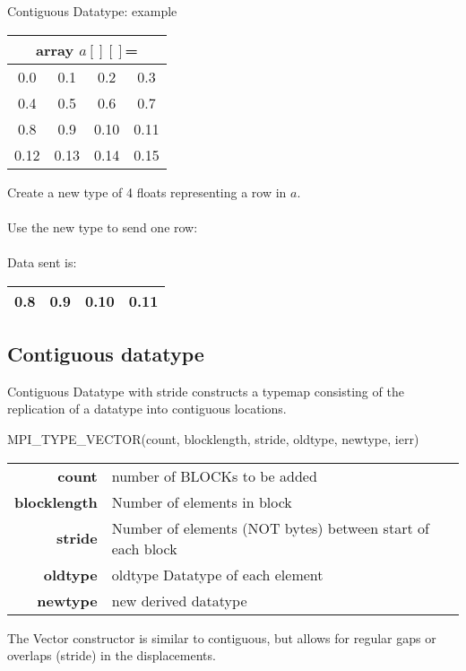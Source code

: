 \documentclass[aspectratio=43]{beamer}
\begin{document}
\begin{frame}[fragile]{Contiguous Datatype: example}
\begin{center}
\begin{tabular}{|c|c|c|c|}
    \multicolumn{4}{c}{array $a[][]$=}\\\hline
0.0  & 0.1  & 0.2  & 0.3\\\hline
0.4  & 0.5  & 0.6  & 0.7\\\hline
0.8  & 0.9  & 0.10 & 0.11\\\hline
0.12 & 0.13 & 0.14 & 0.15\\\hline
\end{tabular}
\end{center}
Create a new type of 4 floats representing a row in $a$.\\
\\[0.5cm]
Use the new type to send one row:\\
\\[0.5cm]
Data sent is:
\begin{tabular}{|c|c|c|c|}
\hline
\color{cscsblue}0.8  & \color{cscsblue}0.9  & \color{cscsblue}0.10 & \color{cscsblue}0.11\\
\hline
\end{tabular}

\end{frame}

\subsection{Contiguous datatype}
\begin{frame}[fragile]{Contiguous Datatype with stride}
 constructs a typemap consisting of the replication of a datatype into contiguous locations.
\begin{Fortranlisting}[]{}
MPI_TYPE_VECTOR(count, blocklength, stride, oldtype, newtype, ierr)
\end{Fortranlisting}
\begin{black1block}{}
\begin{tabular}{rp{7.5cm}}
\textbf{count} & number of BLOCKs to be added\\
\textbf{blocklength} & Number of elements in block\\
\textbf{stride} & Number of elements (NOT bytes) between start of each block\\
\textbf{oldtype} & oldtype Datatype of each element\\
\textbf{newtype} & new derived datatype\\
\end{tabular}
\end{black1block}
The Vector constructor is similar to contiguous, but allows for regular gaps or overlaps (stride) in the displacements.
\end{frame}
\end{document}
